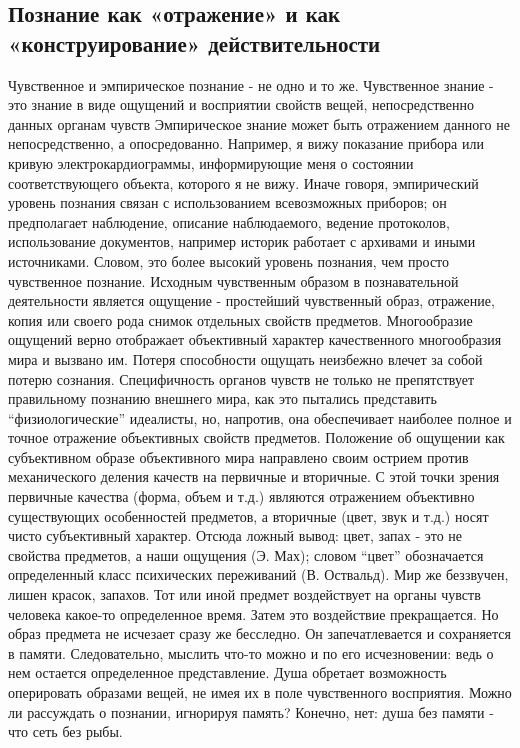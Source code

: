 \documentclass[12pt]{article}
\begin{document}
\subsection{Познание как «отражение» и как «конструирование» действительности}
Чувственное и эмпирическое познание - не одно и то же. Чувственное знание - это знание в виде ощущений и
восприятии свойств вещей, непосредственно данных органам чувств
Эмпирическое знание может быть отражением данного не непосредственно, а опосредованно. Например, я
вижу показание прибора или кривую электрокардиограммы, информирующие меня о состоянии
соответствующего объекта, которого я не вижу. Иначе говоря, эмпирический уровень познания связан с
использованием всевозможных приборов; он предполагает наблюдение, описание наблюдаемого, ведение
протоколов, использование документов, например историк работает с архивами и иными источниками. Словом,
это более высокий уровень познания, чем просто чувственное познание.
Исходным чувственным образом в познавательной деятельности является ощущение - простейший
чувственный образ, отражение, копия или своего рода снимок отдельных свойств предметов. Многообразие
ощущений верно отображает объективный характер качественного многообразия мира и вызвано им. Потеря
способности ощущать неизбежно влечет за собой потерю сознания.
Специфичность органов чувств не только не препятствует правильному познанию внешнего мира, как это
пытались представить “физиологические” идеалисты, но, напротив, она обеспечивает наиболее полное и точное
отражение объективных свойств предметов.
Положение об ощущении как субъективном образе объективного мира направлено своим острием против
механического деления качеств на первичные и вторичные. С этой точки зрения первичные качества (форма,
объем и т.д.) являются отражением объективно существующих особенностей предметов, а вторичные (цвет, звук
и т.д.) носят чисто субъективный характер. Отсюда ложный вывод: цвет, запах - это не свойства предметов, а
наши ощущения (Э. Мах); словом “цвет” обозначается определенный класс психических переживаний (В.
Оствальд). Мир же беззвучен, лишен красок, запахов.
Тот или иной предмет воздействует на органы чувств человека какое-то определенное время. Затем это
воздействие прекращается. Но образ предмета не исчезает сразу же бесследно. Он запечатлевается и
сохраняется в памяти. Следовательно, мыслить что-то можно и по его исчезновении: ведь о нем остается
определенное представление. Душа обретает возможность оперировать образами вещей, не имея их в поле
чувственного восприятия.
Можно ли рассуждать о познании, игнорируя память? Конечно, нет: душа без памяти - что сеть без рыбы.
\end{document}

